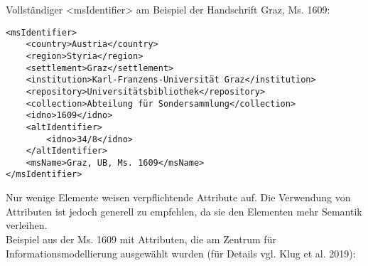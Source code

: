 \documentclass{article}
\begin{document}
        Vollständiger <msIdentifier> am Beispiel der Handschrift Graz,
                  Ms. 1609:\\
            
        \begin{verbatim}<msIdentifier>
    <country>Austria</country>
    <region>Styria</region>
    <settlement>Graz</settlement>
    <institution>Karl-Franzens-Universität Graz</institution>
    <repository>Universitätsbibliothek</repository>
    <collection>Abteilung für Sondersammlung</collection>
    <idno>1609</idno>
    <altIdentifier>
        <idno>34/8</idno>
    </altIdentifier>
    <msName>Graz, UB, Ms. 1609</msName>
</msIdentifier>\end{verbatim}Nur wenige Elemente weisen verpflichtende Attribute auf. Die Verwendung von
                  Attributen ist jedoch generell zu empfehlen, da sie den Elementen mehr Semantik
                  verleihen.\\
            
        Beispiel aus der Ms. 1609 mit Attributen, die am Zentrum für
                  Informationsmodellierung ausgewählt wurden (für Details vgl. Klug et al.
                     2019):\\
            
\end{document}
